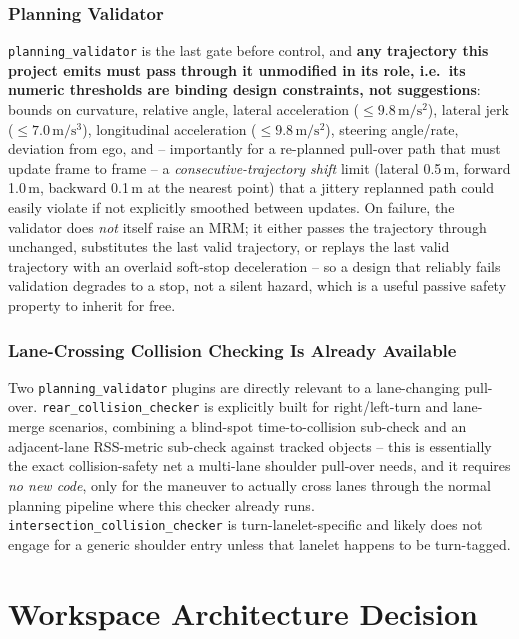 \documentclass[11pt]{article}
\newcommand{\pkg}[1]{\texttt{#1}}
\begin{document}
\subsubsection{Planning Validator}
\pkg{planning\_validator} is the last gate before control, and \textbf{any trajectory this project
emits must pass through it unmodified in its role, i.e.\ its numeric thresholds are binding
design constraints, not suggestions}: bounds on curvature, relative angle, lateral acceleration
($\leq 9.8\,\mathrm{m/s^2}$), lateral jerk ($\leq 7.0\,\mathrm{m/s^3}$), longitudinal acceleration
($\leq 9.8\,\mathrm{m/s^2}$), steering angle/rate, deviation from ego, and -- importantly for a
re-planned pull-over path that must update frame to frame -- a \emph{consecutive-trajectory shift}
limit (lateral 0.5\,m, forward 1.0\,m, backward 0.1\,m at the nearest point) that a jittery replanned
path could easily violate if not explicitly smoothed between updates. On failure, the validator does
\emph{not} itself raise an MRM; it either passes the trajectory through unchanged, substitutes the
last valid trajectory, or replays the last valid trajectory with an overlaid soft-stop deceleration
-- so a design that reliably fails validation degrades to a stop, not a silent hazard, which is a
useful passive safety property to inherit for free.

\subsubsection{Lane-Crossing Collision Checking Is Already Available}
Two \pkg{planning\_validator} plugins are directly relevant to a lane-changing pull-over.
\pkg{rear\_collision\_checker} is explicitly built for right/left-turn and lane-merge scenarios,
combining a blind-spot time-to-collision sub-check and an adjacent-lane RSS-metric sub-check against
tracked objects -- this is essentially the exact collision-safety net a multi-lane shoulder
pull-over needs, and it requires \emph{no new code}, only for the maneuver to actually cross lanes
through the normal planning pipeline where this checker already runs.
\pkg{intersection\_collision\_checker} is turn-lanelet-specific and likely does not engage for a
generic shoulder entry unless that lanelet happens to be turn-tagged.

\section{Workspace Architecture Decision}
\label{sec:workspace}
\end{document}
